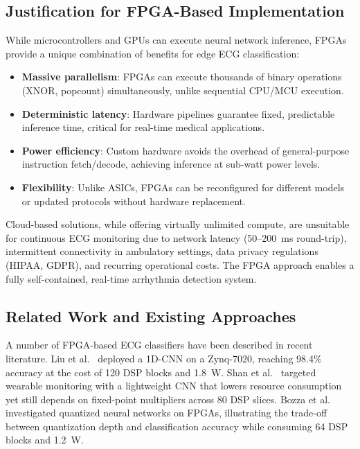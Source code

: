 \documentclass[conference]{IEEEtran}
\begin{document}
\subsection{Justification for FPGA-Based Implementation}

While microcontrollers and GPUs can execute neural network inference, FPGAs provide a unique combination of benefits for edge ECG classification:

\begin{itemize}
    \item \textbf{Massive parallelism}: FPGAs can execute thousands of binary operations (XNOR, popcount) simultaneously, unlike sequential CPU/MCU execution.
    \item \textbf{Deterministic latency}: Hardware pipelines guarantee fixed, predictable inference time, critical for real-time medical applications.
    \item \textbf{Power efficiency}: Custom hardware avoids the overhead of general-purpose instruction fetch/decode, achieving inference at sub-watt power levels.
    \item \textbf{Flexibility}: Unlike ASICs, FPGAs can be reconfigured for different models or updated protocols without hardware replacement.
\end{itemize}

Cloud-based solutions, while offering virtually unlimited compute, are unsuitable for continuous ECG monitoring due to network latency (50--200~ms round-trip), intermittent connectivity in ambulatory settings, data privacy regulations (HIPAA, GDPR), and recurring operational costs. The FPGA approach enables a fully self-contained, real-time arrhythmia detection system.

\subsection{Related Work and Existing Approaches}

A number of FPGA-based ECG classifiers have been described in recent literature. Liu et al.~\cite{liu2020fpga} deployed a 1D-CNN on a Zynq-7020, reaching 98.4\% accuracy at the cost of 120 DSP blocks and 1.8~W. Shan et al.~\cite{shan2022real} targeted wearable monitoring with a lightweight CNN that lowers resource consumption yet still depends on fixed-point multipliers across 80 DSP slices. Bozza et al.~\cite{bozza2023ecg} investigated quantized neural networks on FPGAs, illustrating the trade-off between quantization depth and classification accuracy while consuming 64 DSP blocks and 1.2~W.
\end{document}
